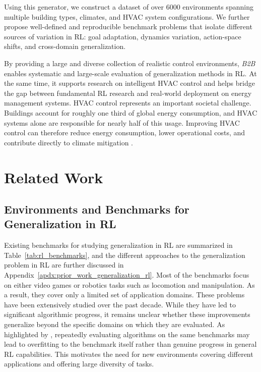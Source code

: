 \documentclass[10pt]{article} %
\newcommand{\btob}{{\textit{B2B}}}
\begin{document}
Using this generator, we construct a dataset of over 6000 environments spanning multiple building types, climates, and HVAC system configurations. We further propose well-defined and reproducible benchmark problems that isolate different sources of variation in RL: goal adaptation, dynamics variation, action-space shifts, and cross-domain generalization.

By providing a large and diverse collection of realistic control environments, \btob{} enables systematic and large-scale evaluation of generalization methods in RL. At the same time, it supports research on intelligent HVAC control and helps bridge the gap between fundamental RL research and real-world deployment on energy management systems. HVAC control represents an important societal challenge. Buildings account for roughly one third of global energy consumption, and HVAC systems alone are responsible for nearly half of this usage. Improving HVAC control can therefore reduce energy consumption, lower operational costs, and contribute directly to climate mitigation \cite{iea_outlook2022}.

\section{Related Work}

\subsection{Environments and Benchmarks for Generalization in RL}
Existing benchmarks for studying generalization in RL are summarized in Table~\ref{tab:rl_benchmarks}, and the different approaches to the generalization problem in RL are further discussed in Appendix~\ref{apdx:prior_work_generalization_rl}. Most of the benchmarks focus on either video games or robotics tasks such as locomotion and manipulation. As a result, they cover only a limited set of application domains. These problems have been extensively studied over the past decade. While they have led to significant algorithmic progress, it remains unclear whether these improvements generalize beyond the specific domains on which they are evaluated. As highlighted by \citep{liao2021}, repeatedly evaluating algorithms on the same benchmarks may lead to overfitting to the benchmark itself rather than genuine progress in general RL capabilities. This motivates the need for new environments covering different applications and offering large diversity of tasks.
\end{document}
